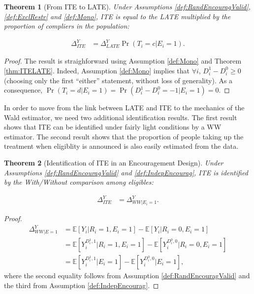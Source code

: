 \documentclass[
]{book}
\newcommand{\esp}[1]{\mathbb{E}[ #1 ]}
\newtheorem{theorem}{Theorem}[chapter]
\theoremstyle{definition}
\theoremstyle{definition}
\theoremstyle{definition}
\theoremstyle{definition}
\theoremstyle{remark}
\begin{document}
\begin{theorem}[From ITE to LATE]
\protect\hypertarget{thm:ITELATEMono}{}{\label{thm:ITELATEMono} \iffalse (From ITE to LATE) \fi{} }Under Assumptions \ref{def:RandEncouragValid}, \ref{def:ExclRestr} and \ref{def:Mono}, ITE is equal to the LATE multiplied by the proportion of compliers in the population:

\begin{align*}
  \Delta^Y_{ITE} & = \Delta^Y_{LATE}\Pr(T_i=c|E_i=1).
\end{align*}
\end{theorem}

\begin{proof}
\iffalse{} {Proof. } \fi{}The result is straighforward using Assumption \ref{def:Mono} and Theorem \ref{thm:ITELATE}.
Indeed, Assumption \ref{def:Mono} implies that \(\forall i\), \(D_i^1-D_i^0\geq 0\) (choosing only the first ``either'' statement, without loss of generality).
As a consequence, \(\Pr(T_i=d|E_i=1)=\Pr(D_i^1-D_i^0=-1|E_i=1)=0\).
\end{proof}

In order to move from the link between LATE and ITE to the mechanics of the Wald estimator, we need two additional identification results.
The first result shows that ITE can be identified under fairly light conditions by a WW estimator.
The second result shows that the proportion of people taking up the treatment when eligiblity is announced is also easily estimated from the data.

\begin{theorem}[Identification of ITE in an Encouragement Design]
\protect\hypertarget{thm:ITEEncourag}{}{\label{thm:ITEEncourag} \iffalse (Identification of ITE in an Encouragement Design) \fi{} }Under Assumptions \ref{def:RandEncouragValid} and \ref{def:IndepEncourag}, ITE is identified by the With/Without comparison among eligibles:

\begin{align*}
  \Delta^Y_{ITE} & = \Delta^Y_{WW|E_i=1}.
\end{align*}
\end{theorem}

\begin{proof}
\iffalse{} {Proof. } \fi{}\begin{align*}
 \Delta^Y_{WW|E=1} & =\esp{Y_i|R_i=1,E_i=1}-\esp{Y_i|R_i=0,E_i=1} \\
                   & = \esp{Y_i^{D_i^1,1}|R_i=1,E_i=1}-\esp{Y_i^{D_i^0,0}|R_i=0,E_i=1} \\
                    & = \esp{Y_i^{D_i^1,1}|E_i=1}-\esp{Y_i^{D_i^0,0}|E_i=1},
\end{align*}
where the second equality follows from Assumption \ref{def:RandEncouragValid} and the third from Assumption \ref{def:IndepEncourag}.
\end{proof}
\end{document}
